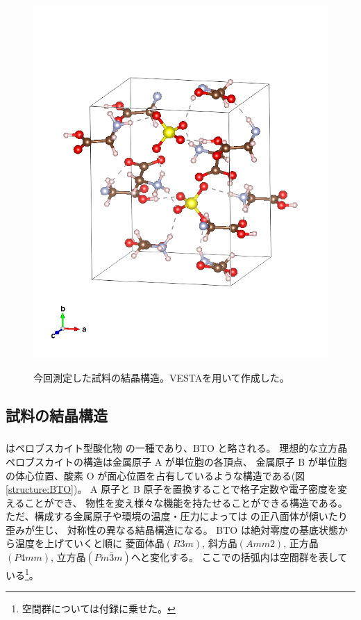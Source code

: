 \documentclass[11pt,dvipdfmx,a4paper]{jsarticle}
\begin{document}
\begin{figure}[H]
\begin{minipage}[t]{0.48\columnwidth}
        \includegraphics[width = \columnwidth]{structure/TGS.png}
        \label{structure:TGS}
    \end{minipage}
    \caption{今回測定した試料の結晶構造。VESTA\cite{VESTA}を用いて作成した。}
\end{figure}

\subsection{試料の結晶構造}
\subsubsection*{}
 はペロブスカイト型酸化物  の一種であり、BTO と略される。
理想的な立方晶ペロブスカイトの構造は金属原子 A が単位胞の各頂点、
金属原子 B が単位胞の体心位置、酸素 O が面心位置を占有しているような構造である(図\ref{structure:BTO})。
A 原子と B 原子を置換することで格子定数や電子密度を変えることができ、
物性を変え様々な機能を持たせることができる構造である。
ただ、構成する金属原子や環境の温度・圧力によっては  の正八面体が傾いたり歪みが生じ、
対称性の異なる結晶構造になる。
BTO は絶対零度の基底状態から温度を上げていくと順に
菱面体晶$(R3m)$, 斜方晶$(Amm2)$,
正方晶$(P4mm)$,
立方晶$(Pm\bar{3}m)$へと変化する。
ここでの括弧内は空間群を表している\footnote{空間群については付録に乗せた。}。
\end{document}

